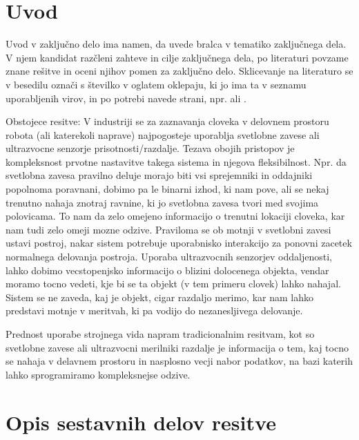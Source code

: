 \documentclass[a4paper,twoside,openright,12pt,slovene]{book}
\begin{document}
\mainmatter

\chapter{Uvod} \label{uvod}

Uvod v zaključno delo ima namen, da uvede bralca v tematiko zaključnega dela. V njem kandidat razčleni zahteve in cilje zaključnega dela, po literaturi povzame znane rešitve in oceni njihov pomen za zaključno delo. Sklicevanje na literaturo se v besedilu označi s številko v oglatem oklepaju, ki jo ima ta v seznamu uporabljenih virov, in po potrebi navede strani, npr. \cite{miklavcic2010objavljanje} ali \cite[stran 520-534]{juznic1992diplomska}.

Obstojece resitve:
V industriji se za zaznavanja cloveka v delovnem prostoru robota (ali katerekoli naprave) najpogosteje uporablja svetlobne zavese ali ultrazvocne senzorje prisotnosti/razdalje. Tezava obojih pristopov je kompleksnost prvotne nastavitve takega sistema in njegova fleksibilnost. Npr. da svetlobna zavesa pravilno deluje morajo biti vsi sprejemniki in oddajniki popolnoma poravnani, dobimo pa le binarni izhod, ki nam pove, ali se nekaj trenutno nahaja znotraj ravnine, ki jo svetlobna zavesa tvori med svojima polovicama. To nam da zelo omejeno informacijo o trenutni lokaciji cloveka, kar nam tudi zelo omeji mozne odzive. Praviloma se ob motnji v svetlobni zavesi ustavi postroj, nakar sistem potrebuje uporabnisko interakcijo za ponovni zacetek normalnega delovanja postroja. Uporaba ultrazvocnih senzorjev oddaljenosti, lahko dobimo vecstopenjsko informacijo o blizini dolocenega objekta, vendar moramo tocno vedeti, kje bi se ta objekt (v tem primeru clovek) lahko nahajal. Sistem se ne zaveda, kaj je objekt, cigar razdaljo merimo, kar nam lahko predstavi motnje v meritvah, ki pa vodijo do nezanesljivega delovanje.

Prednost uporabe strojnega vida napram tradicionalnim resitvam, kot so svetlobne zavese ali ultrazvocni merilniki razdalje je informacija o tem, kaj tocno se nahaja v delavnem prostoru in nasplosno vecji nabor podatkov, na bazi katerih lahko sprogramiramo kompleksnejse odzive.

\chapter{Opis sestavnih delov resitve} \label{opis_komponent}
\end{document}
